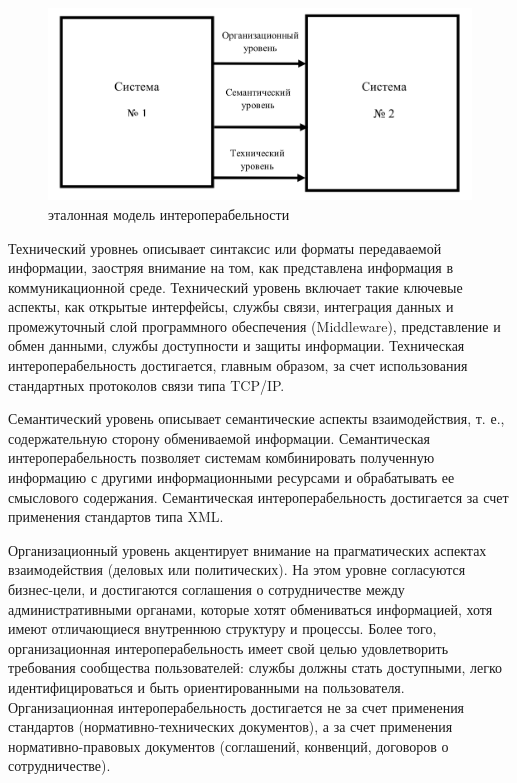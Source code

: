 \begin{figure}[H]
    \centering
    \includegraphics[width=.9\textwidth]{img/intero.png}
    \caption{эталонная модель интероперабельности}
\end{figure}



Технический уровнеь описывает синтаксис или форматы передаваемой информации, заостряя внимание на том, как представлена информация в коммуникационной среде. Технический уровень включает такие ключевые аспекты, как открытые интерфейсы, службы связи, интеграция данных и промежуточный слой программного обеспечения (Middleware), представление и обмен данными, службы доступности и защиты информации. Техническая интероперабельность достигается, главным образом, за счет использования стандартных протоколов связи типа TCP/IP.

Семантический уровень описывает семантические аспекты взаимодействия, т. е., содержательную сторону обмениваемой информации. Семантическая интероперабельность позволяет системам комбинировать полученную информацию с другими информационными ресурсами и обрабатывать ее смыслового содержания. Семантическая интероперабельность достигается за счет применения стандартов типа XML.

Организационный уровень акцентирует внимание на прагматических аспектах взаимодействия (деловых или политических). На этом уровне согласуются бизнес-цели, и достигаются соглашения о сотрудничестве между административными органами, которые хотят обмениваться информацией, хотя имеют отличающиеся внутреннюю структуру и процессы. Более того, организационная интероперабельность имеет свой целью удовлетворить требования сообщества пользователей: службы должны стать доступными, легко идентифицироваться и быть ориентированными на пользователя. Организационная интероперабельность достигается не за счет применения стандартов (нормативно-технических документов), а за счет применения нормативно-правовых документов (соглашений, конвенций, договоров о сотрудничестве).

